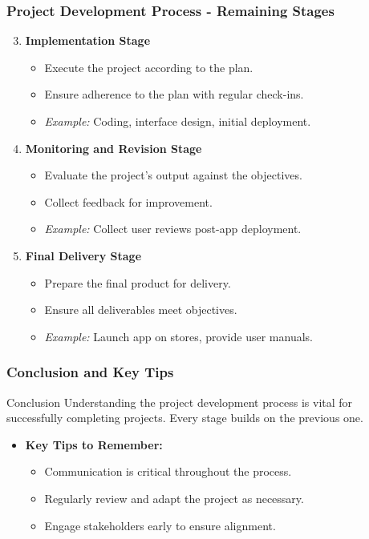 \documentclass{beamer}
\begin{document}
\begin{frame}[fragile]
    \frametitle{Project Development Process - Remaining Stages}
    \begin{enumerate}
        \setcounter{enumi}{2}
        \item \textbf{Implementation Stage}
        \begin{itemize}
            \item Execute the project according to the plan.
            \item Ensure adherence to the plan with regular check-ins.
            \item \textit{Example:} Coding, interface design, initial deployment.
        \end{itemize}
        
        \item \textbf{Monitoring and Revision Stage}
        \begin{itemize}
            \item Evaluate the project's output against the objectives.
            \item Collect feedback for improvement.
            \item \textit{Example:} Collect user reviews post-app deployment.
        \end{itemize}
        
        \item \textbf{Final Delivery Stage}
        \begin{itemize}
            \item Prepare the final product for delivery.
            \item Ensure all deliverables meet objectives.
            \item \textit{Example:} Launch app on stores, provide user manuals.
        \end{itemize}
    \end{enumerate}
\end{frame}

\begin{frame}[fragile]
    \frametitle{Conclusion and Key Tips}
    \begin{block}{Conclusion}
        Understanding the project development process is vital for successfully completing projects. Every stage builds on the previous one.
    \end{block}
    
    \begin{itemize}
        \item \textbf{Key Tips to Remember:}
        \begin{itemize}
            \item Communication is critical throughout the process.
            \item Regularly review and adapt the project as necessary.
            \item Engage stakeholders early to ensure alignment.
        \end{itemize}
    \end{itemize}
\end{frame}
\end{document}
